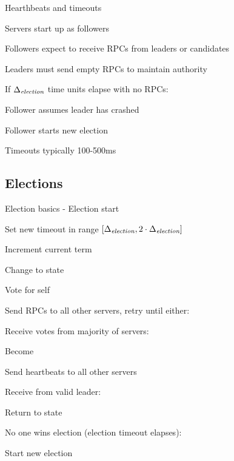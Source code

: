 \begin{frame}{Hearthbeats and timeouts}

\BIL
\item Servers start up as followers
\item Followers expect to receive RPCs from leaders or candidates
\item Leaders must send empty \AppendRPC RPCs to maintain authority
\item If $\Delta_{\textit{election}}$ time units elapse with no RPCs:
	\BI
	\item Follower assumes leader has crashed
	\item Follower starts new election
	\item Timeouts typically 100-500ms
	\EI
\EIL
	
\end{frame}

\subsection{Elections}

\begin{frame}{Election basics - Election start}

\BEL
\item Set new timeout in range $[\Delta_{\textit{election}}, 2 \cdot \Delta_{\textit{election}}]$
\item Increment current term
\item Change to  state
\item Vote for self
\item Send \VoteRPC RPCs to all other servers, retry until either:
	\BI
	\item Receive votes from majority of servers:
		\BI
		\item Become 
		\item Send \AppendRPC heartbeats to all other servers
		\EI
	\item Receive \AppendRPC from valid leader:
		\BI
		\item Return to  state
		\EI
	\item No one wins election (election timeout elapses):
		\BI
		\item Start new election
		\EI
	\EI
\EEL

\end{frame}

